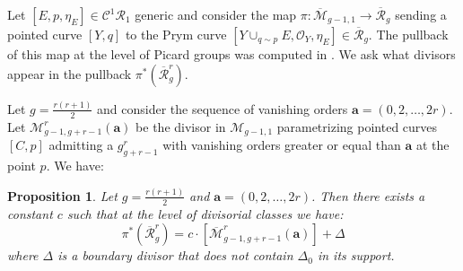 \documentclass{article}
\theoremstyle{plain}
\newtheorem{prop}[trm]{Proposition}
\theoremstyle{definition}
\def\OO{\mathcal{O}}
\def\cM{\mathcal{M}}
\def\rr{\overline{\mathcal{R}}}
\def\mm{\overline{\mathcal{M}}}
\begin{document}
Let $[E,p,\eta_E] \in \mathcal{C}^1\mathcal{R}_1$ generic and consider the map $\pi\colon \mm_{g-1,1} \rightarrow \rr_g$ sending a pointed curve $[Y,q]$ to the Prym curve $[Y\cup_{q\sim p}E,\OO_Y, \eta_E] \in \rr_g$. The pullback of this map at the level of Picard groups was computed in \cite[Proposition 6.1]{BudKodPrym}. We ask what divisors appear in the pullback $\pi^*(\rr^r_g)$. 

Let $g = \frac{r(r+1)}{2}$ and consider the sequence of vanishing orders $\textbf{a} = (0,2,\ldots, 2r)$. Let $\cM^r_{g-1,g+r-1}(\textbf{a})$ be the divisor in $\cM_{g-1,1}$ parametrizing pointed curves $[C,p]$ admitting a $g^r_{g+r-1}$ with vanishing orders greater or equal than $\textbf{a}$ at the point $p$. We have:
\begin{prop} \label{secondrel}Let $g = \frac{r(r+1)}{2}$ and $\textbf{a} = (0,2,\ldots,2r)$. Then there exists a constant $c$ such that at the level of divisorial classes we have: 
	\[ \pi^*(\rr^r_g) = c\cdot[\mm^r_{g-1,g+r-1}(\textbf{a})] + \Delta \] 
	where $\Delta$ is a boundary divisor that does not contain $\Delta_0$ in its support.
\end{prop}
\end{document}
